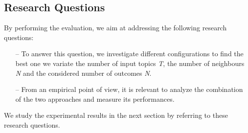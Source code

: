 %
%



\subsection{Research Questions} \label{sec:ResearchQuestions}
By performing the evaluation, we aim at addressing the following research questions:
\begin{itemize}
	\item[--] \rqfirst To answer this question, we investigate different configurations to find the best one \ie we variate the number of input topics \emph{T}, the number of neighbours \emph{N} and the considered number of outcomes \emph{N}.
	
	\item[--] \rqsecond From an empirical point of view, it is relevant to analyze the combination of the two approaches and measure its performances.
\end{itemize}


We study the experimental results in the next section by referring to these research questions.
